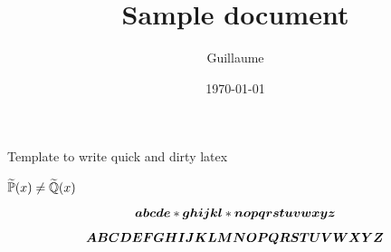 \documentclass{article}
\title{Sample document}
\author{Guillaume}
\date{\today}
\begin{document}
\maketitle

Template to write quick and dirty latex

$\widetilde{\mathbb{P}}(x) \neq \widetilde{\mathbb{Q}}(x)$

\begin{equation}
\bm{a} \bm{b} \bm{c} \bm{d} \bm{e} * \bm{g} \bm{h} \bm{i} \bm{j} \bm{k} \bm{l} * \bm{n} \bm{o} \bm{p} \bm{q} \bm{r} \bm{s} \bm{t} \bm{u} \bm{v} \bm{w} \bm{x} \bm{y} \bm{z}
\end{equation}

\begin{equation}
\bm{A} \bm{B} \bm{C} \bm{D} \bm{E} \bm{F} \bm{G} \bm{H} \bm{I} \bm{J} \bm{K} \bm{L} \bm{M} \bm{N} \bm{O} \bm{P} \bm{Q} \bm{R} \bm{S} \bm{T} \bm{U} \bm{V} \bm{W} \bm{X} \bm{Y} \bm{Z}
\end{equation}
\end{document}
